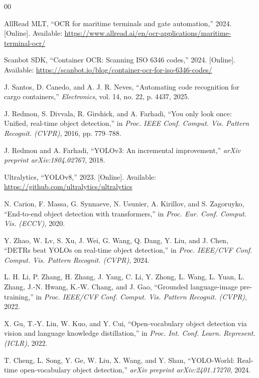 \documentclass[conference]{IEEEtran}
\begin{document}
\begin{thebibliography}{00}

 AllRead MLT, ``OCR for maritime terminals and gate automation,'' 2024. [Online]. Available: \url{https://www.allread.ai/en/ocr-applications/maritime-terminal-ocr/}

 Scanbot SDK, ``Container OCR: Scanning ISO 6346 codes,'' 2024. [Online]. Available: \url{https://scanbot.io/blog/container-ocr-for-iso-6346-codes/}

 J. Santos, D. Canedo, and A. J. R. Neves, ``Automating code recognition for cargo containers,'' \textit{Electronics}, vol. 14, no. 22, p. 4437, 2025.

 J. Redmon, S. Divvala, R. Girshick, and A. Farhadi, ``You only look once: Unified, real-time object detection,'' in \textit{Proc. IEEE Conf. Comput. Vis. Pattern Recognit. (CVPR)}, 2016, pp. 779--788.

 J. Redmon and A. Farhadi, ``YOLOv3: An incremental improvement,'' \textit{arXiv preprint arXiv:1804.02767}, 2018.

 Ultralytics, ``YOLOv8,'' 2023. [Online]. Available: \url{https://github.com/ultralytics/ultralytics}

 N. Carion, F. Massa, G. Synnaeve, N. Usunier, A. Kirillov, and S. Zagoruyko, ``End-to-end object detection with transformers,'' in \textit{Proc. Eur. Conf. Comput. Vis. (ECCV)}, 2020.

 Y. Zhao, W. Lv, S. Xu, J. Wei, G. Wang, Q. Dang, Y. Liu, and J. Chen, ``DETRs beat YOLOs on real-time object detection,'' in \textit{Proc. IEEE/CVF Conf. Comput. Vis. Pattern Recognit. (CVPR)}, 2024.

 L. H. Li, P. Zhang, H. Zhang, J. Yang, C. Li, Y. Zhong, L. Wang, L. Yuan, L. Zhang, J.-N. Hwang, K.-W. Chang, and J. Gao, ``Grounded language-image pre-training,'' in \textit{Proc. IEEE/CVF Conf. Comput. Vis. Pattern Recognit. (CVPR)}, 2022.

 X. Gu, T.-Y. Lin, W. Kuo, and Y. Cui, ``Open-vocabulary object detection via vision and language knowledge distillation,'' in \textit{Proc. Int. Conf. Learn. Represent. (ICLR)}, 2022.

 T. Cheng, L. Song, Y. Ge, W. Liu, X. Wang, and Y. Shan, ``YOLO-World: Real-time open-vocabulary object detection,'' \textit{arXiv preprint arXiv:2401.17270}, 2024.


\end{thebibliography}
\end{document}
